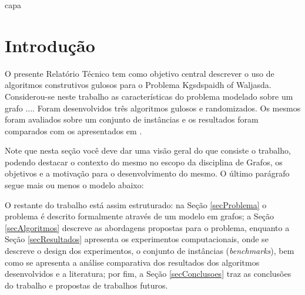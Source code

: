 \documentclass[12pt,fleqn]{article}
\begin{document}
\pagestyle {empty}

 {capa}           %



\pagestyle {empty}

\newpage



\pagestyle {plain}



\setcounter{page}{0} 
 
\setlength{\parindent}{0in}  %
\parskip 5pt  

\section{Introdução}

O presente Relatório Técnico tem como objetivo central descrever o uso de algoritmos construtivos gulosos para o Problema Kgsdspaidh of Waljasda. Considerou-se neste trabalho as características do problema modelado sobre um grafo .... Foram desenvolvidos três algoritmos gulosos e randomizados. Os mesmos foram avaliados sobre um conjunto de instâncias e os resultados foram comparados com os apresentados em \cite{moradi2015semi}.

Note que nesta seção você deve dar uma visão geral do que consiste o trabalho, podendo destacar o contexto do mesmo no escopo da disciplina de Grafos, os objetivos e a motivação para o desenvolvimento do mesmo. O último parágrafo segue mais ou menos o modelo abaixo:

O restante do trabalho está assim estruturado: na Seção \ref{secProblema} o problema é descrito formalmente através de um modelo em grafos; a Seção \ref{secAlgoritmos} descreve as abordagens propostas para o problema, enquanto a Seção \ref{secResultados} apresenta os experimentos computacionais, onde se descreve o design dos experimentos, o conjunto de instâncias (\textit{benchmarks}), bem como se apresenta a análise comparativa dos resultados dos algoritmos desenvolvidos e a literatura; por fim, a Seção \ref{secConclusoes} traz as conclusões do trabalho e propostas de trabalhos futuros.
\end{document}
